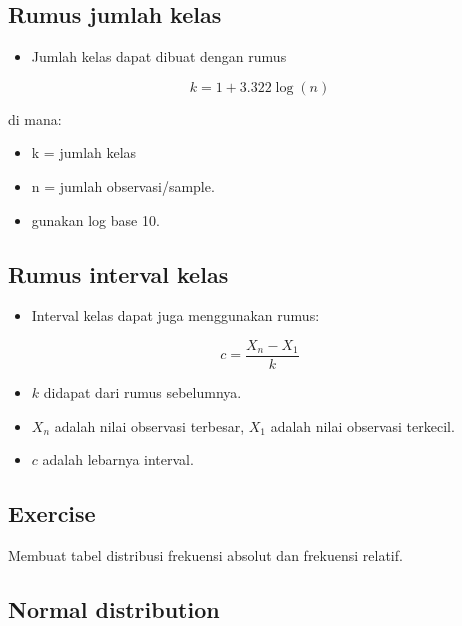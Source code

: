 \documentclass[
  letterpaper,
  DIV=11,
  numbers=noendperiod]{scrartcl}
\providecommand{\tightlist}{%
  \setlength{\itemsep}{0pt}\setlength{\parskip}{0pt}}\usepackage{longtable,booktabs,array}
\begin{document}
\hypertarget{rumus-jumlah-kelas}{%
\subsection{Rumus jumlah kelas}\label{rumus-jumlah-kelas}}

\begin{itemize}
\tightlist
\item
  Jumlah kelas dapat dibuat dengan rumus
\end{itemize}

\[k=1+3.322\log(n)\]

di mana:

\begin{itemize}
\tightlist
\item
  k = jumlah kelas
\item
  n = jumlah observasi/sample.
\item
  gunakan log base 10.
\end{itemize}

\hypertarget{rumus-interval-kelas}{%
\subsection{Rumus interval kelas}\label{rumus-interval-kelas}}

\begin{itemize}
\tightlist
\item
  Interval kelas dapat juga menggunakan rumus:
\end{itemize}

\[c=\frac{X_n-X_1}{k}\]

\begin{itemize}
\item
  \(k\) didapat dari rumus sebelumnya.
\item
  \(X_n\) adalah nilai observasi terbesar, \(X_1\) adalah nilai
  observasi terkecil.
\item
  \(c\) adalah lebarnya interval.
\end{itemize}

\hypertarget{exercise}{%
\subsection{Exercise}\label{exercise}}

Membuat tabel distribusi frekuensi absolut dan frekuensi relatif.

\hypertarget{normal-distribution}{%
\subsection{Normal distribution}\label{normal-distribution}}
\end{document}
